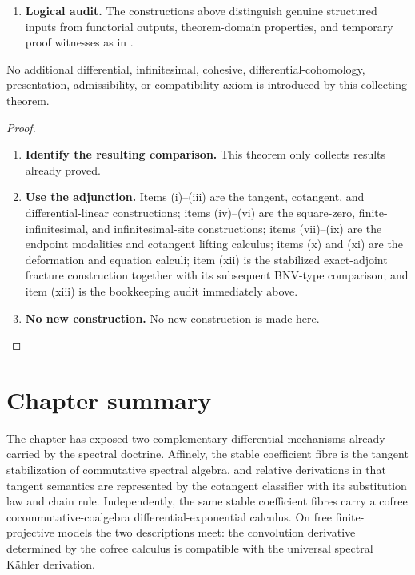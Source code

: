 \begin{theorem}
\begin{enumerate}[label=(\roman*)]
    \item \textbf{Logical audit.}
    The constructions above distinguish genuine structured inputs from
    functorial outputs, theorem-domain properties, and temporary proof
    witnesses as in .
\end{enumerate}
No additional differential, infinitesimal, cohesive, differential-cohomology,
presentation, admissibility, or compatibility axiom is introduced by this
collecting theorem.
\end{theorem}

\begin{proof}
\leavevmode
\begin{enumerate}[label=\textup{(\arabic*)}]
    \item \textbf{Identify the resulting comparison.}
    This theorem only collects results already proved.

    \item \textbf{Use the adjunction.}
    Items \textup{(i)}--\textup{(iii)} are the tangent, cotangent, and differential-linear
    constructions; items \textup{(iv)}--\textup{(vi)} are the square-zero, finite-infinitesimal,
    and infinitesimal-site constructions; items \textup{(vii)}--\textup{(ix)} are the endpoint
    modalities and cotangent lifting calculus; items \textup{(x)} and \textup{(xi)} are the
    deformation and equation calculi; item \textup{(xii)} is the stabilized exact-adjoint
    fracture construction together with its subsequent BNV-type comparison; and item
    \textup{(xiii)} is the bookkeeping audit immediately above.

    \item \textbf{No new construction.}
    No new construction is made here.
\end{enumerate}
\end{proof}

\section{Chapter summary}
\label{sec:differentiated-spectral-doctrine-summary}

The chapter has exposed two complementary differential mechanisms already
carried by the spectral doctrine. Affinely, the stable coefficient fibre is
the tangent stabilization of commutative spectral algebra, and relative
derivations in that tangent semantics are represented by the cotangent
classifier with its substitution law and chain rule. Independently, the same
stable coefficient fibres carry a cofree cocommutative-coalgebra
differential-exponential calculus. On free finite-projective models the two
descriptions meet: the convolution derivative determined by the cofree
calculus is compatible with the universal spectral K\"ahler derivation.

